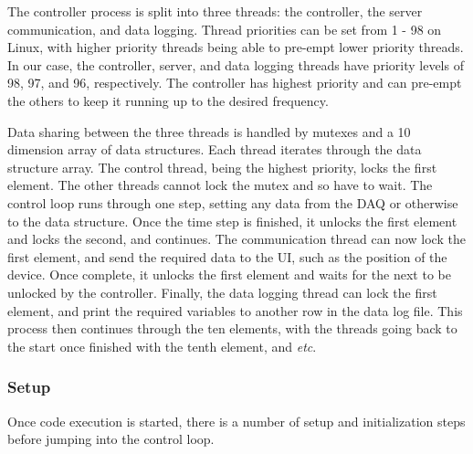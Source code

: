 \documentclass[12pt]{report}
\begin{document}
	
	The controller process is split into three threads: the controller, the server communication, and data logging. Thread priorities can be set from 1 - 98 on Linux, with higher priority threads being able to pre-empt lower priority threads. In our case, the controller, server, and data logging threads have priority levels of 98, 97, and 96, respectively. The controller has highest priority and can pre-empt the others to keep it running up to the desired frequency. 
	
	Data sharing between the three threads is handled by mutexes and a 10 dimension array of data structures. Each thread iterates through the data structure array. The control thread, being the highest priority, locks the first element. The other threads cannot lock the mutex and so have to wait. The control loop runs through one step, setting any data from the DAQ or otherwise to the data structure. Once the time step is finished, it unlocks the first element and locks the second, and continues. The communication thread can now lock the first element, and send the required data to the UI, such as the position of the device. Once complete, it unlocks the first element and waits for the next to be unlocked by the controller. Finally, the data logging thread  can lock the first element, and print the required variables to another row in the data log file. This process then continues through the ten elements, with the threads going back to the start once finished with the tenth element, and \textit{etc}. 
	
	\subsubsection{Setup}
	
	Once code execution is started, there is a number of setup and initialization steps before jumping into the control loop. 
	
\end{document}
